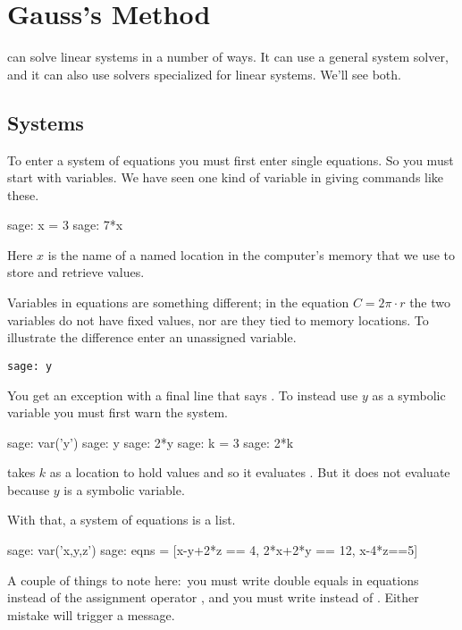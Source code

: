 \chapter{Gauss's Method}

\Sage{} can solve linear systems in a number of ways.
It can use a general system solver, and
it can also use solvers specialized for linear systems.
We'll see both. 



\section{Systems}
To enter a system of equations you must first enter single equations.
So you must start with variables.
We have seen one kind of variable in giving commands like these.
\begin{sagecommandline}
sage: x = 3
sage: 7*x
\end{sagecommandline}
Here $x$ is the name of a named location in the computer's memory
that we use to store and retrieve values.

Variables in equations are something different; in the equation
$C=2\pi\cdot r$ the two variables do not have fixed values, nor
are they tied to memory locations. 
To illustrate the difference enter an unassigned 
variable.
\begin{lstlisting}
sage: y
\end{lstlisting}
You get an exception with a final line that says
.
To instead use $y$ as a symbolic variable you must first
warn the system.
\begin{sagecommandline}
sage: var('y')
sage: y
sage: 2*y
sage: k = 3
sage: 2*k
\end{sagecommandline}
\Sage{} takes $k$ as a location to hold
values and so it evaluates .
But it does not evaluate  because $y$ is a symbolic variable.

With that, a system of equations is a list.
\begin{sagecommandline}
sage: var('x,y,z')                                  
sage: eqns = [x-y+2*z == 4, 2*x+2*y == 12, x-4*z==5]
\end{sagecommandline}
A couple of things to note here:~you 
must write double equals \inlinecode{==} in equations instead of 
the assignment operator \inlinecode{=}, 
and you must write 
instead of .
Either mistake will trigger a  
 message.

